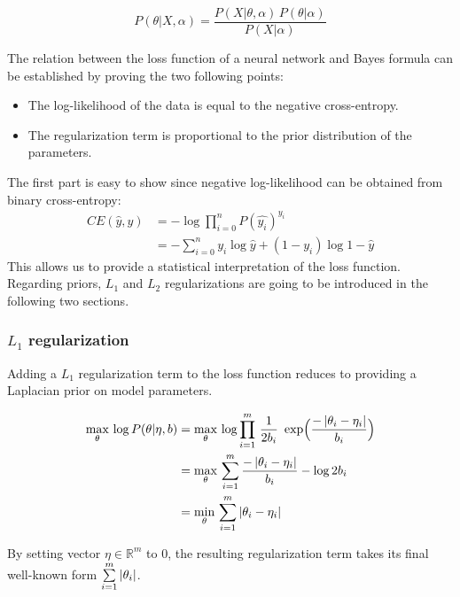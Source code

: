     	\begin{equation}
    	    P(\theta \vert X, \alpha) = \frac{P(X \vert \theta, \alpha)\,P(\theta \vert \alpha)}{P(X \vert \alpha)}
    	\end{equation}

    	The relation between the loss function of a neural network and Bayes formula can be established
    	by proving the two following points:

    	\begin{itemize}
    	    \item The log-likelihood of the data is equal to the negative cross-entropy.
    	    \item The regularization term is proportional to the prior distribution of the parameters.
    	\end{itemize}

    	The first part is easy to show since negative log-likelihood can be obtained from binary cross-entropy:
    	\begin{align}
    		CE(\hat{y}, y) & = - \log{\prod\limits_{i=0}^n P(\hat{y_i})^{y_i}}  \\
    		& = -\sum\limits_{i=0}^n y_i \log{\hat{y}} + (1 - y_i) \log{1 - \hat{y}}
    	\end{align}
    	This allows us to provide a statistical interpretation of the loss function.
    	Regarding priors, $L_1$ and $L_2$ regularizations are going to be introduced in the following two sections.

	\subsubsection{$L_1$ regularization}

	   Adding a $L_1$ regularization term to the loss function reduces to providing a Laplacian
	   prior on model parameters.

	   \begin{align}
	       \max_{\theta}\, \log{P(\theta \vert \eta, b)}
		   & = \max_{\theta}\, \log{\prod\limits_{i=1}^m \, \frac{1}{2b_i}\,
		   \text{ exp}\Big(\frac{- \left|\theta_i - \eta_i\right|}{b_i}\Big)} \\
		   & = \max_{\theta}\, \sum\limits_{i=1}^m \frac{- \left|\theta_i - \eta_i\right|}{b_i} - \log{2b_i} \\
		   & = \min_{\theta}\, \sum\limits_{i=1}^m \left|\theta_i - \eta_i\right|
	   \end{align}

	   By setting vector $\eta \in \mathbb{R}^m$ to $0$, the resulting regularization term
	   takes its final well-known form $\sum\limits_{i=1}^m \left|\theta_i\right|$.

